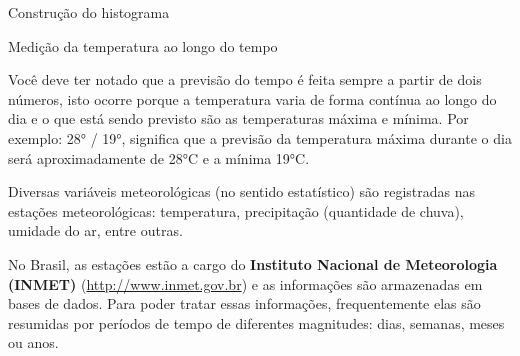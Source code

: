 {\begin{task}{Construção do histograma}











\end{task}

\label{est1-ativ-10}
\begin{task}{Medição da temperatura ao longo do tempo}

Você deve ter notado que a previsão do tempo é feita sempre a partir de dois números, isto ocorre porque a temperatura varia de forma contínua ao longo do dia e o que está sendo previsto são as temperaturas máxima e mínima. Por exemplo: 28° / 19°, significa que a previsão da temperatura máxima durante o dia será aproximadamente de 28°C e a mínima 19°C.

Diversas variáveis meteorológicas (no sentido estatístico) são registradas nas estações meteorológicas: temperatura, precipitação (quantidade de chuva), umidade do ar, entre outras.

No Brasil, as estações estão a cargo do \textbf {Instituto Nacional de Meteorologia (INMET)} (\href{http://www.inmet.gov.br}{http://www.inmet.gov.br}) e as informações são armazenadas em bases de dados. Para poder tratar essas informações, frequentemente elas são resumidas por períodos de tempo de diferentes magnitudes: dias, semanas, meses ou anos.


\end{task}}
